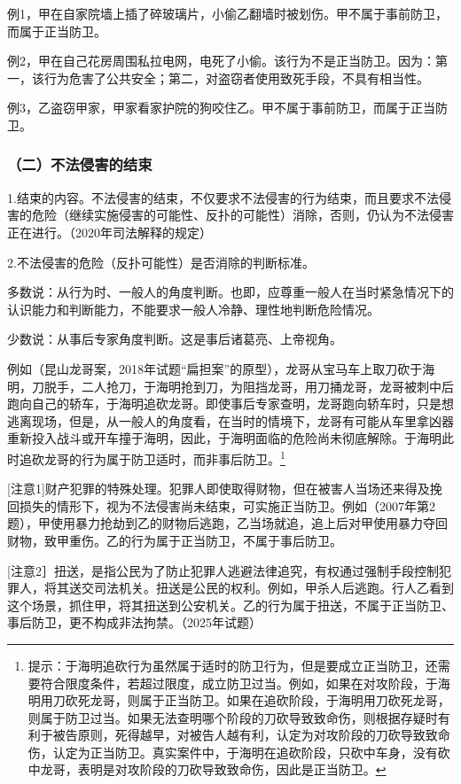 例1，甲在自家院墙上插了碎玻璃片，小偷乙翻墙时被划伤。甲不属于事前防卫，而属于正当防卫。

例2，甲在自己花房周围私拉电网，电死了小偷。该行为不是正当防卫。因为：第一，该行为危害了公共安全；第二，对盗窃者使用致死手段，不具有相当性。

例3，乙盗窃甲家，甲家看家护院的狗咬住乙。甲不属于事前防卫，而属于正当防卫。

\subsubsection*{（二）不法侵害的结束}

1.结束的内容。不法侵害的结束，不仅要求不法侵害的行为结束，而且要求不法侵害的危险（继续实施侵害的可能性、反扑的可能性）消除，否则，仍认为不法侵害正在进行。（2020年司法解释的规定）

2.不法侵害的危险（反扑可能性）是否消除的判断标准。

多数说：从行为时、一般人的角度判断。也即，应尊重一般人在当时紧急情况下的认识能力和判断能力，不能要求一般人冷静、理性地判断危险情况。

少数说：从事后专家角度判断。这是事后诸葛亮、上帝视角。

例如（昆山龙哥案，2018年试题“扁担案”的原型），龙哥从宝马车上取刀砍于海明，刀脱手，二人抢刀，于海明抢到刀，为阻挡龙哥，用刀捅龙哥，龙哥被刺中后跑向自己的轿车，于海明追砍龙哥。即使事后专家查明，龙哥跑向轿车时，只是想逃离现场，但是，从一般人的角度看，在当时的情境下，龙哥有可能从车里拿凶器重新投入战斗或开车撞于海明，因此，于海明面临的危险尚未彻底解除。于海明此时追砍龙哥的行为属于防卫适时，而非事后防卫。\footnote{提示：于海明追砍行为虽然属于适时的防卫行为，但是要成立正当防卫，还需要符合限度条件，若超过限度，成立防卫过当。例如，如果在对攻阶段，于海明用刀砍死龙哥，则属于正当防卫。如果在追砍阶段，于海明用刀砍死龙哥，则属于防卫过当。如果无法查明哪个阶段的刀砍导致致命伤，则根据存疑时有利于被告原则，死得越早，对被告人越有利，认定为对攻阶段的刀砍导致致命伤，认定为正当防卫。真实案件中，于海明在追砍阶段，只砍中车身，没有砍中龙哥，表明是对攻阶段的刀砍导致致命伤，因此是正当防卫。}

[注意1]财产犯罪的特殊处理。犯罪人即使取得财物，但在被害人当场还来得及挽回损失的情形下，视为不法侵害尚未结束，可实施正当防卫。例如（2007年第2题），甲使用暴力抢劫到乙的财物后逃跑，乙当场就追，追上后对甲使用暴力夺回财物，致甲重伤。乙的行为属于正当防卫，不属于事后防卫。

[注意2］扭送，是指公民为了防止犯罪人逃避法律追究，有权通过强制手段控制犯罪人，将其送交司法机关。扭送是公民的权利。例如，甲杀人后逃跑。行人乙看到这个场景，抓住甲，将其扭送到公安机关。乙的行为属于扭送，不属于正当防卫、事后防卫，更不构成非法拘禁。（2025年试题）


